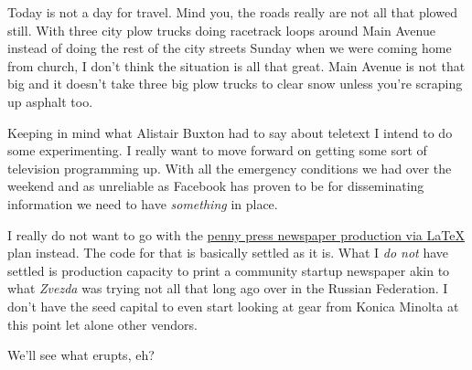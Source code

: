 Today is not a day for travel. Mind you, the roads really are not all
that plowed still. With three city plow trucks doing racetrack loops
around Main Avenue instead of doing the rest of the city streets Sunday
when we were coming home from church, I don't think the situation is all
that great. Main Avenue is not that big and it doesn't take three big
plow trucks to clear snow unless you're scraping up asphalt too.

Keeping in mind what Alistair Buxton had to say about teletext I intend
to do some experimenting. I really want to move forward on getting some
sort of television programming up. With all the emergency conditions we
had over the weekend and as unreliable as Facebook has proven to be for
disseminating information we need to have \emph{something} in place.

I really do not want to go with the
\href{https://code.launchpad.net/~skellat/+git/auto-newspaper}{penny
press newspaper production via LaTeX} plan instead. The code for that is
basically settled as it is. What I \emph{do not} have settled is
production capacity to print a community startup newspaper akin to what
\emph{Zvezda} was trying not all that long ago over in the Russian
Federation. I don't have the seed capital to even start looking at gear
from Konica Minolta at this point let alone other vendors.

We'll see what erupts, eh?
